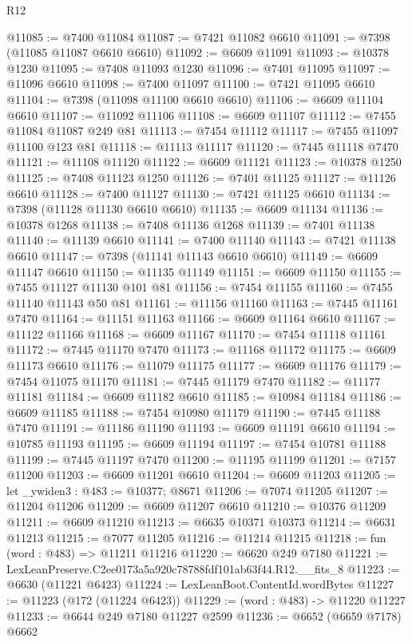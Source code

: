 \begin{lexlean}{R12}
\begin{coremodule}
@11085 := @7400 @11084
@11087 := @7421 @11082 @6610
@11091 := @7398 (@11085 @11087 @6610 @6610)
@11092 := @6609 @11091
@11093 := @10378 @1230
@11095 := @7408 @11093 @1230
@11096 := @7401 @11095
@11097 := @11096 @6610
@11098 := @7400 @11097
@11100 := @7421 @11095 @6610
@11104 := @7398 (@11098 @11100 @6610 @6610)
@11106 := @6609 @11104 @6610
@11107 := @11092 @11106
@11108 := @6609 @11107
@11112 := @7455 @11084 @11087 @249 @81
@11113 := @7454 @11112
@11117 := @7455 @11097 @11100 @123 @81
@11118 := @11113 @11117
@11120 := @7445 @11118 @7470
@11121 := @11108 @11120
@11122 := @6609 @11121
@11123 := @10378 @1250
@11125 := @7408 @11123 @1250
@11126 := @7401 @11125
@11127 := @11126 @6610
@11128 := @7400 @11127
@11130 := @7421 @11125 @6610
@11134 := @7398 (@11128 @11130 @6610 @6610)
@11135 := @6609 @11134
@11136 := @10378 @1268
@11138 := @7408 @11136 @1268
@11139 := @7401 @11138
@11140 := @11139 @6610
@11141 := @7400 @11140
@11143 := @7421 @11138 @6610
@11147 := @7398 (@11141 @11143 @6610 @6610)
@11149 := @6609 @11147 @6610
@11150 := @11135 @11149
@11151 := @6609 @11150
@11155 := @7455 @11127 @11130 @101 @81
@11156 := @7454 @11155
@11160 := @7455 @11140 @11143 @50 @81
@11161 := @11156 @11160
@11163 := @7445 @11161 @7470
@11164 := @11151 @11163
@11166 := @6609 @11164 @6610
@11167 := @11122 @11166
@11168 := @6609 @11167
@11170 := @7454 @11118 @11161
@11172 := @7445 @11170 @7470
@11173 := @11168 @11172
@11175 := @6609 @11173 @6610
@11176 := @11079 @11175
@11177 := @6609 @11176
@11179 := @7454 @11075 @11170
@11181 := @7445 @11179 @7470
@11182 := @11177 @11181
@11184 := @6609 @11182 @6610
@11185 := @10984 @11184
@11186 := @6609 @11185
@11188 := @7454 @10980 @11179
@11190 := @7445 @11188 @7470
@11191 := @11186 @11190
@11193 := @6609 @11191 @6610
@11194 := @10785 @11193
@11195 := @6609 @11194
@11197 := @7454 @10781 @11188
@11199 := @7445 @11197 @7470
@11200 := @11195 @11199
@11201 := @7157 @11200
@11203 := @6609 @11201 @6610
@11204 := @6609 @11203
@11205 := let _ywiden3 : @483 := @10377; @8671
@11206 := @7074 @11205
@11207 := @11204 @11206
@11209 := @6609 @11207 @6610
@11210 := @10376 @11209
@11211 := @6609 @11210
@11213 := @6635 @10371 @10373
@11214 := @6631 @11213
@11215 := @7077 @11205
@11216 := @11214 @11215
@11218 := fun (word : @483) => @11211 @11216
@11220 := @6620 @249 @7180
@11221 := LexLeanPreserve.C2ee0173a5a920c78788fdf101ab63f44.R12.__fits_8
@11223 := @6630 (@11221 @6423)
@11224 := LexLeanBoot.ContentId.wordBytes
@11227 := @11223 (@172 (@11224 @6423))
@11229 := (word : @483) -> @11220 @11227
@11233 := @6644 @249 @7180 @11227 @2599
@11236 := @6652 (@6659 @7178) @6662

\end{coremodule}
\end{lexlean}
